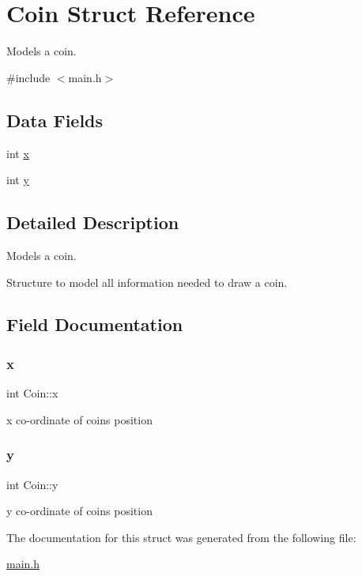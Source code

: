 \hypertarget{struct_coin}{}\section{Coin Struct Reference}
\label{struct_coin}


Models a coin.  




{\ttfamily \#include $<$main.\+h$>$}

\subsection*{Data Fields}
\begin{DoxyCompactItemize}
\item 
int \hyperlink{struct_coin_ab70f9405edd662a3943b83f058e2501f}{x}
\item 
int \hyperlink{struct_coin_a88562a5f8129840729ab0ecf15edde3d}{y}
\end{DoxyCompactItemize}


\subsection{Detailed Description}
Models a coin. 

Structure to model all information needed to draw a coin. 

\subsection{Field Documentation}
\mbox{\label{struct_coin_ab70f9405edd662a3943b83f058e2501f}} 
\subsubsection{\texorpdfstring{x}{x}}
{\footnotesize\ttfamily int Coin\+::x}

x co-\/ordinate of coins position \mbox{\label{struct_coin_a88562a5f8129840729ab0ecf15edde3d}} 
\subsubsection{\texorpdfstring{y}{y}}
{\footnotesize\ttfamily int Coin\+::y}

y co-\/ordinate of coins position 

The documentation for this struct was generated from the following file\+:\begin{DoxyCompactItemize}
\item 
\hyperlink{main_8h}{main.\+h}\end{DoxyCompactItemize}
